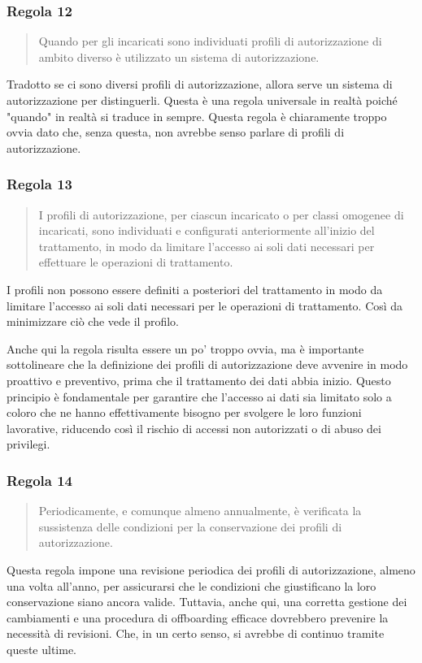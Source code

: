 \subsubsection*{Regola 12}
\begin{quote}
    \item Quando per gli incaricati sono individuati profili di autorizzazione di ambito diverso è utilizzato un sistema di autorizzazione.
\end{quote}

Tradotto se ci sono diversi profili di autorizzazione, allora serve un sistema di autorizzazione per distinguerli.
Questa è una regola universale in realtà poiché "quando" in realtà si traduce in sempre.
Questa regola è chiaramente troppo ovvia dato che, senza questa, non avrebbe senso parlare di profili di autorizzazione.
\subsubsection*{Regola 13}
\begin{quote}
    I profili di autorizzazione, per ciascun incaricato o per classi omogenee di incaricati, sono individuati e configurati anteriormente all'inizio del trattamento, in modo da limitare l'accesso ai soli dati necessari per effettuare le operazioni di trattamento.
\end{quote}
I profili non possono essere definiti a posteriori del trattamento in modo da limitare l'accesso ai soli dati necessari per le operazioni di trattamento.
Così da minimizzare ciò che vede il profilo.

Anche qui la regola risulta essere un po' troppo ovvia, ma è importante sottolineare che la definizione dei profili di autorizzazione deve avvenire in modo proattivo e preventivo, prima che il trattamento dei dati abbia inizio.
Questo principio è fondamentale per garantire che l'accesso ai dati sia limitato solo a coloro che ne hanno effettivamente bisogno per svolgere le loro funzioni lavorative, riducendo così il rischio di accessi non autorizzati o di abuso dei privilegi.
\subsubsection*{Regola 14}
\begin{quote}
    Periodicamente, e comunque almeno annualmente, è verificata la sussistenza delle condizioni per la conservazione dei profili di autorizzazione.
\end{quote}
Questa regola impone una revisione periodica dei profili di autorizzazione, almeno una volta all'anno, per assicurarsi che le condizioni che giustificano la loro conservazione siano ancora valide.
Tuttavia, anche qui, una corretta gestione dei cambiamenti e una procedura di offboarding efficace dovrebbero prevenire la necessità di revisioni.
Che, in un certo senso, si avrebbe di continuo tramite queste ultime.
